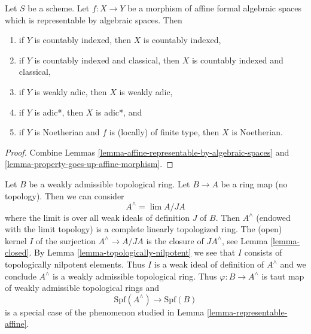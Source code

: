 \begin{lemma}
\label{lemma-property-goes-up-affine}
Let $S$ be a scheme. Let $f : X \to Y$ be a morphism of affine formal
algebraic spaces which is representable by algebraic spaces. Then
\begin{enumerate}
\item if $Y$ is countably indexed, then $X$ is countably indexed,
\item if $Y$ is countably indexed and classical, then $X$ is countably
indexed and classical,
\item if $Y$ is weakly adic, then $X$ is weakly adic,
\item if $Y$ is adic*, then $X$ is adic*, and
\item if $Y$ is Noetherian and $f$ is (locally) of finite type, then
$X$ is Noetherian.
\end{enumerate}
\end{lemma}

\begin{proof}
Combine Lemmas \ref{lemma-affine-representable-by-algebraic-spaces} and
\ref{lemma-property-goes-up-affine-morphism}.
\end{proof}

\begin{example}
\label{example-representable-morphism-from-completion}
Let $B$ be a weakly admissible topological ring. Let $B \to A$ be
a ring map (no topology). Then we can consider
$$
A^\wedge = \lim A/JA
$$
where the limit is over all weak ideals of definition $J$ of $B$.
Then $A^\wedge$ (endowed with the limit topology) is a
complete linearly topologized ring. The (open) kernel $I$
of the surjection $A^\wedge \to A/JA$ is the closure of $JA^\wedge$, see
Lemma \ref{lemma-closed}. By
Lemma \ref{lemma-topologically-nilpotent}
we see that $I$ consists of topologically nilpotent elements.
Thus $I$ is a weak ideal of definition of $A^\wedge$ and we conclude
$A^\wedge$ is a weakly admissible topological ring. Thus
$\varphi : B \to A^\wedge$ is taut map of weakly admissible
topological rings and
$$
\text{Spf}(A^\wedge) \longrightarrow \text{Spf}(B)
$$
is a special case of the phenomenon studied in
Lemma \ref{lemma-representable-affine}.
\end{example}

